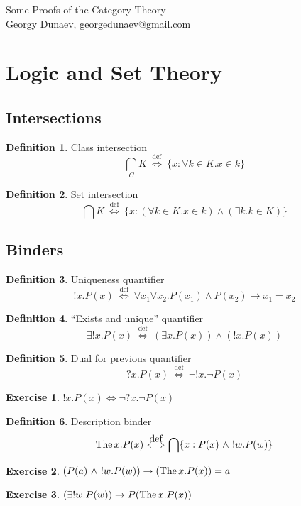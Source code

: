 \documentclass[10pt,a4paper]{article}
\theoremstyle{definition}
\newtheorem{definition}{Definition}[section]
\newtheorem{exercise}{Exercise}[section]
\newcommand{\The}{{\mbox{The\,}}}
\newcommand{\LRA}{\Longleftrightarrow}
\newcommand{\defi}{{\mbox{def}}}
\newcommand{\propdef}{{\stackrel{\defi}{\ \Longleftrightarrow\ }}}
\newcommand{\inter}{{\bigcap}}
\newcommand{\interclass}{{{\bigcap}_C}}
\begin{document}
Some Proofs of the Category Theory\\
Georgy Dunaev, georgedunaev@gmail.com\\
\section{Logic and Set Theory}
\subsection{Intersections}
\begin{definition} Class intersection
$$\interclass K \propdef \{x: \forall k\in K. x\in k\}$$
\end{definition}

\begin{definition} Set intersection
$$\inter K \propdef \{x: (\forall k\in K. x\in k)\land (\exists k.k\in K)\}$$
\end{definition}

\subsection{Binders}
\begin{definition} Uniqueness quantifier
$$!x. P(x) \propdef \forall x_1 \forall x_2. P(x_1)\land P(x_2)\to x_1=x_2$$
\end{definition}

\begin{definition} ``Exists and unique'' quantifier
$$\exists !x. P(x) \propdef (\exists x. P(x))\land(!x. P(x))$$
\end{definition}

\begin{definition}  Dual for previous quantifier 
$$?x. P(x) \propdef \neg !x. \neg P(x)$$
\end{definition}

\begin{exercise}
$!x. P(x) \LRA \neg ?x. \neg P(x)$
\end{exercise}

\begin{definition} Description binder
$$\The x. P(x) \propdef \inter \{x:P(x)\ \land\ !w.P(w)\}$$
\end{definition}

\begin{exercise}
$(P(a)\ \land\ !w.P(w)) \rightarrow (\The x. P(x))=a$
\end{exercise}

\begin{exercise}
$(\exists !w.P(w)) \rightarrow P(\The x. P(x))$
\end{exercise}
\end{document}
